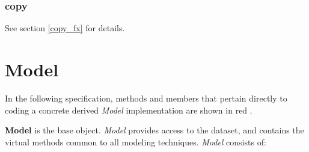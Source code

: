 \documentclass{report}
\def\beginred{\color{red}}
\def\endcolor{\color{black}}
\begin{document}
\subsubsection{copy}

See section \ref{copy_fx} for details.

\section{Model}

In the following specification, methods and members that pertain
directly to coding a concrete derived {\em Model} implementation are
shown in \beginred red \endcolor.

{\bf Model} is the base object. {\em Model} provides access to the
dataset, and contains the virtual methods common to all modeling
techniques.  {\em Model} consists of:
\end{document}
